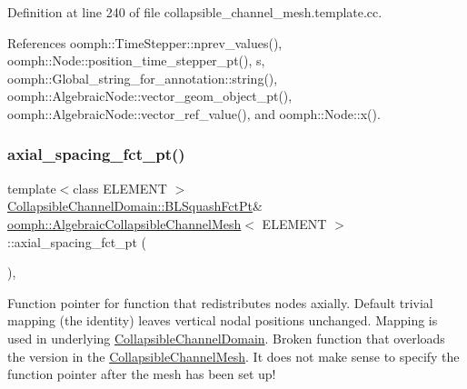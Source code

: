 Definition at line 240 of file collapsible\+\_\+channel\+\_\+mesh.\+template.\+cc.



References oomph\+::\+Time\+Stepper\+::nprev\+\_\+values(), oomph\+::\+Node\+::position\+\_\+time\+\_\+stepper\+\_\+pt(), s, oomph\+::\+Global\+\_\+string\+\_\+for\+\_\+annotation\+::string(), oomph\+::\+Algebraic\+Node\+::vector\+\_\+geom\+\_\+object\+\_\+pt(), oomph\+::\+Algebraic\+Node\+::vector\+\_\+ref\+\_\+value(), and oomph\+::\+Node\+::x().

\mbox{\label{classoomph_1_1AlgebraicCollapsibleChannelMesh_afa53bd526ff0903526afbdf5e6f4f532}} 
\subsubsection{\texorpdfstring{axial\+\_\+spacing\+\_\+fct\+\_\+pt()}{axial\_spacing\_fct\_pt()}}
{\footnotesize\ttfamily template$<$class E\+L\+E\+M\+E\+NT $>$ \\
\hyperlink{classoomph_1_1CollapsibleChannelDomain_a2bf1d7943bfac134a5c27a54c7e1faed}{Collapsible\+Channel\+Domain\+::\+B\+L\+Squash\+Fct\+Pt}\& \hyperlink{classoomph_1_1AlgebraicCollapsibleChannelMesh}{oomph\+::\+Algebraic\+Collapsible\+Channel\+Mesh}$<$ E\+L\+E\+M\+E\+NT $>$\+::axial\+\_\+spacing\+\_\+fct\+\_\+pt (\begin{DoxyParamCaption}{ }\end{DoxyParamCaption})\hspace{0.3cm}{\ttfamily [inline]}, {\ttfamily [virtual]}}



Function pointer for function that redistributes nodes axially. Default trivial mapping (the identity) leaves vertical nodal positions unchanged. Mapping is used in underlying \hyperlink{classoomph_1_1CollapsibleChannelDomain}{Collapsible\+Channel\+Domain}. Broken function that overloads the version in the \hyperlink{classoomph_1_1CollapsibleChannelMesh}{Collapsible\+Channel\+Mesh}. It does not make sense to specify the function pointer after the mesh has been set up! 



